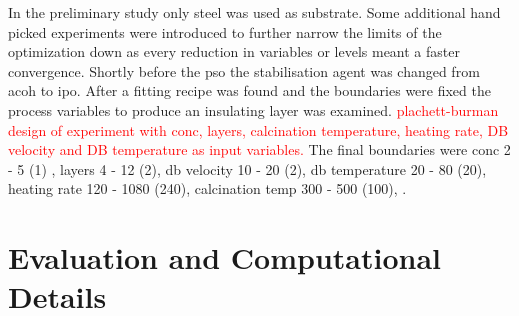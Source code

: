 \documentclass[a4paper]{article}
\newcommand{\td}[1]{\textcolor{red}{#1}}
\begin{document}
In the preliminary study only steel was used as substrate.
Some additional hand picked experiments were introduced to further narrow the limits of 
the optimization down as every reduction in variables or levels meant a faster convergence.
Shortly before the \gls{pso} the stabilisation agent was changed from \gls{acoh} to 
\gls{ipo}.
After a fitting recipe was found and the boundaries were fixed the process variables to 
produce an insulating layer was examined. 
\td{plachett-burman design of experiment with conc, layers, calcination temperature, heating rate, DB velocity and DB temperature as input variables.}
The final boundaries were
conc 2 - 5 (1) ,
layers 4 - 12 (2),
\gls{db} velocity 10 - 20 (2),
\gls{db} temperature 20 - 80 (20),
heating rate 120 - 1080 (240),
calcination temp 300 - 500 (100),
.


\section{Evaluation and Computational Details}
\end{document}
